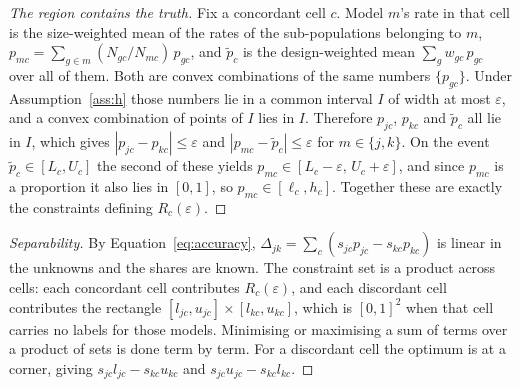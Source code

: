 \begin{proof}[The region contains the truth]
Fix a concordant cell $c$. Model $m$'s rate in that cell is the size-weighted mean of the
rates of the sub-populations belonging to $m$,
$p_{mc} = \sum_{g \in m} (N_{gc}/N_{mc})\, p_{gc}$, and $\tilde p_c$ is the design-weighted
mean $\sum_g w_{gc}\, p_{gc}$ over all of them. Both are convex combinations of the same
numbers $\{p_{gc}\}$. Under Assumption~\ref{ass:h} those numbers lie in a common interval $I$
of width at most $\varepsilon$, and a convex combination of points of $I$ lies in $I$.
Therefore $p_{jc}$, $p_{kc}$ and $\tilde p_c$ all lie in $I$, which gives
$|p_{jc} - p_{kc}| \le \varepsilon$ and $|p_{mc} - \tilde p_c| \le \varepsilon$ for
$m \in \{j,k\}$. On the event $\tilde p_c \in [L_c, U_c]$ the second of these yields
$p_{mc} \in [L_c - \varepsilon,\, U_c + \varepsilon]$, and since $p_{mc}$ is a proportion it
also lies in $[0,1]$, so $p_{mc} \in [\ell_c, h_c]$. Together these are exactly the
constraints defining $R_c(\varepsilon)$.
\end{proof}

\begin{proof}[Separability]
By Equation~\eqref{eq:accuracy}, $\Delta_{jk} = \sum_c (s_{jc} p_{jc} - s_{kc} p_{kc})$ is
linear in the unknowns and the shares are known. The constraint set is a product across
cells: each concordant cell contributes $R_c(\varepsilon)$, and each discordant cell
contributes the rectangle $[l_{jc}, u_{jc}] \times [l_{kc}, u_{kc}]$, which is
$[0,1]^2$ when that cell carries no labels for those models. Minimising or maximising a sum of
terms over a product of sets is done term by term. For a discordant cell the optimum is at a
corner, giving $s_{jc} l_{jc} - s_{kc} u_{kc}$ and $s_{jc} u_{jc} - s_{kc} l_{kc}$.
\end{proof}

